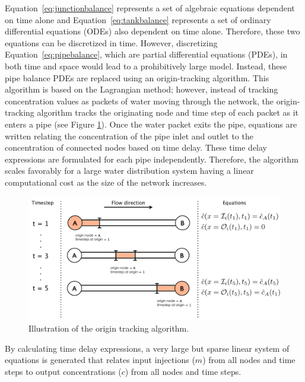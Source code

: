 Equation~\ref{eq:junctionbalance} represents a set of algebraic equations
dependent on time alone and Equation~\ref{eq:tankbalance} represents
a set of ordinary differential equations (ODEs) also dependent on time alone. Therefore, these two equations
can be discretized in time. However, discretizing Equation~\ref{eq:pipebalance},
which are partial differential equations (PDEs), in both time and space would lead to a prohibitively
large model. Instead, these pipe balance PDEs are replaced using an origin-tracking
algorithm. This algorithm is based on the Lagrangian method; however,
instead of tracking concentration values as packets of water moving
through the network, the origin-tracking algorithm tracks the originating
node and time step of each packet as it enters a pipe (see Figure \ref{fig:origin_figure}). 
Once the water packet exits the pipe, equations are written relating
the concentration of the pipe inlet and outlet to the concentration
of connected nodes based on time delay. These time delay expressions
are formulated for each pipe independently. Therefore, the algorithm
scales favorably for a large water distribution system having a linear
computational cost as the size of the network increases. 

\begin{figure}[!h]
\begin{center}
\includegraphics[scale=0.38]{graphics/origin_figure.pdf}\caption{Illustration of the origin tracking algorithm.}
\label{fig:origin_figure}
\end{center}
\end{figure}


By calculating time delay expressions, a very large but sparse linear
system of equations is generated that relates 
input injections ($m$)
from all nodes and time steps to output concentrations ($c$) from
all nodes and time steps.

